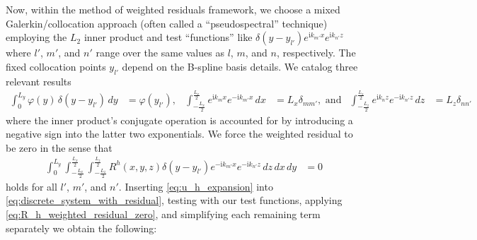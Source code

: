 \documentclass[letterpaper,11pt,nointlimits,reqno,draft]{amsart}
\newcommand{\ii}{\ensuremath{\mathrm{i}}}
\begin{document}
Now, within the method of weighted residuals framework, we choose a mixed
Galerkin/collocation approach (often called a ``pseudospectral'' technique)
employing the $L_{2}$ inner product and test ``functions'' like
$\delta(y-y_{l'}) e^{\ii k_{m'} x}e^{\ii k_{n'} z}$ where $l'$, $m'$, and $n'$
range over the same values as $l$, $m$, and $n$, respectively.  The fixed
collocation points $y_{l'}$ depend on the B-spline basis details.  We catalog
three relevant results
\begin{align}
   \int_0^{L_y} \varphi(y) \, \delta(y-y_{l'}) \,d\!y
&= \varphi(y_{l'}),
&
   \int_{-\frac{L_x}{2}}^{\frac{L_x}{2}} e^{\ii k_m x} e^{-\ii k_{m'} x} \,d\!x
&= L_x \delta_{m m'}, \text{ and}
&
   \int_{-\frac{L_z}{2}}^{\frac{L_z}{2}} e^{\ii k_n z} e^{-\ii k_{n'} z} \,d\!z
&= L_z \delta_{n n'}
\end{align}
where the inner product's conjugate operation is accounted for by introducing a
negative sign into the latter two exponentials.  We force the weighted residual
to be zero in the sense that
\begin{align}
  \int_0^{L_y}
  \int_{-\frac{L_x}{2}}^{\frac{L_x}{2}}
  \int_{-\frac{L_z}{2}}^{\frac{L_z}{2}}
  R^h\!\left(x,y,z\right) \delta(y-y_{l'}) e^{-\ii k_{m'} x}e^{-\ii k_{n'} z}
  \,d\!z \,d\!x \,d\!y
  &=
  0
  \label{eq:R_h_weighted_residual_zero}
\end{align}
holds for all $l'$, $m'$, and $n'$.  Inserting \eqref{eq:u_h_expansion} into
\eqref{eq:discrete_system_with_residual}, testing with our test functions,
applying \eqref{eq:R_h_weighted_residual_zero}, and simplifying each remaining
term separately we obtain the following:
\end{document}
